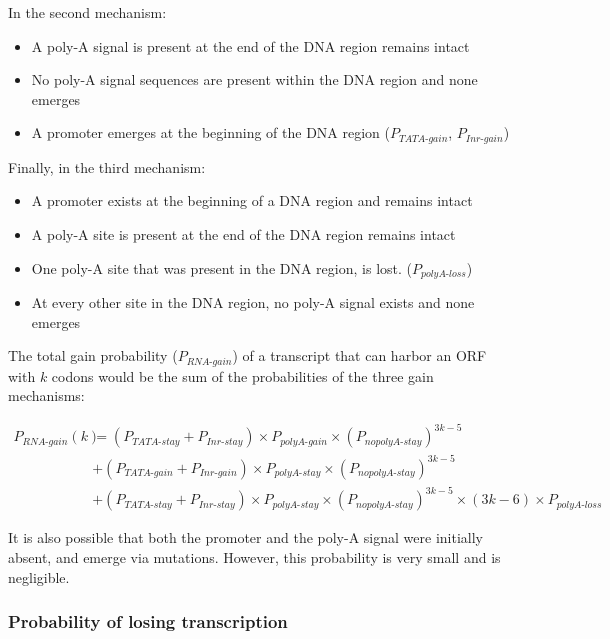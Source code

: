 \documentclass[12pt,a4paper]{article}
\begin{document}
\vspace{\baselineskip}
In the second mechanism:
\begin{itemize}
\item A poly-A signal is present at the end of the DNA region remains intact 
\item No poly-A signal sequences are present within the DNA region and none emerges
\item A promoter emerges at the beginning of the DNA region ($P_\textit{TATA-gain}$, $P_\textit{Inr-gain}$)
\end{itemize}

\vspace{\baselineskip}
Finally, in the third mechanism:
\begin{itemize}
\item A promoter exists at the beginning of a DNA region and remains intact
\item A poly-A site is present at the end of the DNA region remains intact
\item One poly-A site that was present in the DNA region, is lost. ($P_\textit{polyA-loss}$)
\item At every other site in the DNA region, no poly-A signal exists and none emerges
\end{itemize}


The total gain probability ($P_\textit{RNA-gain}$) of a transcript that can harbor an ORF with $k$ codons  would be the sum of the probabilities of the three gain mechanisms:

\begin{align}
P_\textit{RNA-gain}(k) &  = (P_\textit{TATA-stay} + P_\textit{Inr-stay})\times P_\textit{polyA-gain}\times (P_\textit{nopolyA-stay})^{3k-5} \nonumber\\[1ex]
%
& + (P_\textit{TATA-gain} + P_\textit{Inr-gain})\times P_\textit{polyA-stay}\times (P_\textit{nopolyA-stay})^{3k-5} \nonumber \\[1ex]
& + (P_\textit{TATA-stay} + P_\textit{Inr-stay})\times P_\textit{polyA-stay}\times (P_\textit{nopolyA-stay})^{3k-5} \times (3k-6) \times P_\textit{polyA-loss}
\label{eqrnagain}
\end{align}

It is also possible that both the promoter and the poly-A signal were initially absent, and emerge via mutations. However, this probability is very small and is negligible.


\subsubsection{Probability of losing transcription}
\end{document}
